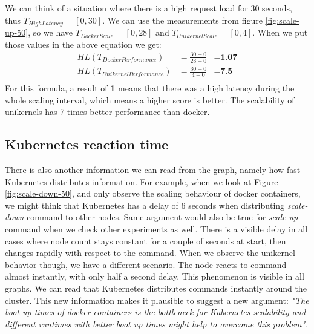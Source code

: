 We can think of a situation where there is a high request load for 30 seconds, thus \(T_{HighLatency}=[0,30]\). We can use the measurements from figure \ref{fig:scale-up-50}, so we have \(T_{DockerScale}=[0,28]\) and \(T_{UnikernelScale}=[0,4]\). When we put those values in the above equation we get:
\begin{equation*}
  \begin{aligned}
  HL(T_{DockerPerformance})&=\frac{30-0}{28-0}&=\textbf{1.07} \\
  HL(T_{UnikernelPerformance})&=\frac{30-0}{4-0}&=\textbf{7.5} \\
  \end{aligned}
\end{equation*}
For this formula, a result of \textbf{1} means that there was a high latency during the whole scaling interval, which means a higher score is better. The scalability of unikernels has 7 times better performance than docker.
\fi

\subsection{Kubernetes reaction time}
There is also another information we can read from the graph, namely how fast Kubernetes distributes information. For example, when we look at Figure \ref{fig:scale-down-50}, and only observe the scaling behaviour of docker containers, we might think that Kubernetes has a delay of 6 seconds when distributing \textit{scale-down} command to other nodes. Same argument would also be true for \textit{scale-up} command when we check other experiments as well. There is a visible delay in all cases where node count stays constant for a couple of seconds at start, then changes rapidly with respect to the command. When we observe the unikernel behavior though, we have a different scenario. The node reacts to command almost instantly, with only half a second delay. This phenomenon is visible in all graphs. We can read that Kubernetes distributes commands instantly around the cluster. This new information makes it plausible to suggest a new argument: \textit{"The boot-up times of docker containers is the bottleneck for Kubernetes scalability and different runtimes with better boot up times might help to overcome this problem"}.


  
